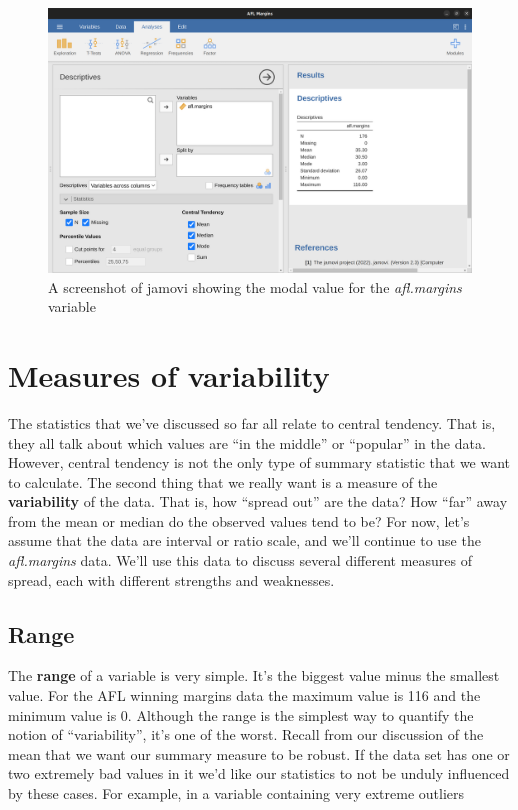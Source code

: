 \documentclass[
  a4paper,
]{book}
\begin{document}
\begin{figure}

\includegraphics[width=1\textwidth,height=\textheight]{images/fig4-7.png} \hfill{}

\caption{\label{fig-fig4-7}A screenshot of jamovi showing the modal
value for the \emph{afl.margins} variable}

\end{figure}

\hypertarget{sec-Measures-of-variability}{%
\section{Measures of variability}\label{sec-Measures-of-variability}}

The statistics that we've discussed so far all relate to central
tendency. That is, they all talk about which values are ``in the
middle'' or ``popular'' in the data. However, central tendency is not
the only type of summary statistic that we want to calculate. The second
thing that we really want is a measure of the \textbf{variability} of
the data. That is, how ``spread out'' are the data? How ``far'' away
from the mean or median do the observed values tend to be? For now,
let's assume that the data are interval or ratio scale, and we'll
continue to use the \emph{afl.margins} data. We'll use this data to
discuss several different measures of spread, each with different
strengths and weaknesses.

\hypertarget{range}{%
\subsection{Range}\label{range}}

The \textbf{range} of a variable is very simple. It's the biggest value
minus the smallest value. For the AFL winning margins data the maximum
value is 116 and the minimum value is 0. Although the range is the
simplest way to quantify the notion of ``variability'', it's one of the
worst. Recall from our discussion of the mean that we want our summary
measure to be robust. If the data set has one or two extremely bad
values in it we'd like our statistics to not be unduly influenced by
these cases. For example, in a variable containing very extreme outliers
\end{document}
